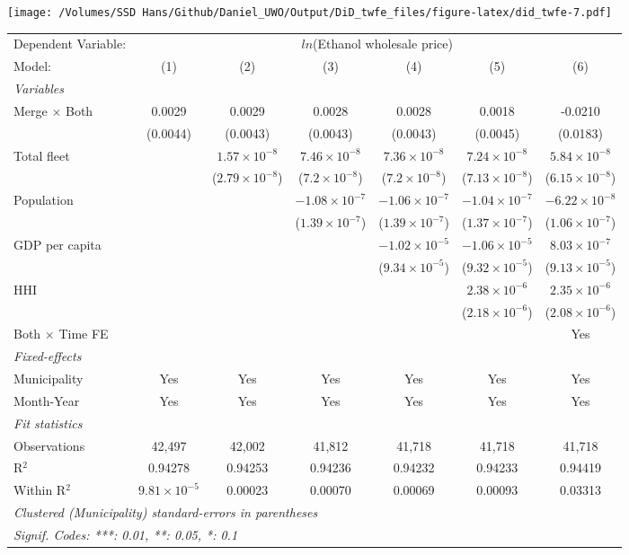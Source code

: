 \documentclass[
]{article}
\begin{document}
\texttt{[image: /Volumes/SSD Hans/Github/Daniel\_UWO/Output/DiD\_twfe\_files/figure-latex/did\_twfe-7.pdf]}

\begin{tabular}{lcccccc}
\tabularnewline\midrule\midrule
Dependent Variable:&\multicolumn{6}{c}{$ln$(Ethanol wholesale price)}\\
Model:&(1) & (2) & (3) & (4) & (5) & (6)\\
\midrule \emph{Variables}&   &   &   &   &   &  \\
Merge $\times $ Both & 0.0029 & 0.0029 & 0.0028 & 0.0028 & 0.0018 & -0.0210\\
  &(0.0044) & (0.0043) & (0.0043) & (0.0043) & (0.0045) & (0.0183)\\
Total fleet &    & $1.57\times 10^{-8}$ & $7.46\times 10^{-8}$ & $7.36\times 10^{-8}$ & $7.24\times 10^{-8}$ & $5.84\times 10^{-8}$\\
  &   & ($2.79\times 10^{-8}$) & ($7.2\times 10^{-8}$) & ($7.2\times 10^{-8}$) & ($7.13\times 10^{-8}$) & ($6.15\times 10^{-8}$)\\
Population &    &    & $-1.08\times 10^{-7}$ & $-1.06\times 10^{-7}$ & $-1.04\times 10^{-7}$ & $-6.22\times 10^{-8}$\\
  &   &    & ($1.39\times 10^{-7}$) & ($1.39\times 10^{-7}$) & ($1.37\times 10^{-7}$) & ($1.06\times 10^{-7}$)\\
GDP per capita &    &    &    & $-1.02\times 10^{-5}$ & $-1.06\times 10^{-5}$ & $8.03\times 10^{-7}$\\
  &   &    &    & ($9.34\times 10^{-5}$) & ($9.32\times 10^{-5}$) & ($9.13\times 10^{-5}$)\\
HHI &    &    &    &    & $2.38\times 10^{-6}$ & $2.35\times 10^{-6}$\\
  &   &    &    &    & ($2.18\times 10^{-6}$) & ($2.08\times 10^{-6}$)\\
Both $\times$ Time FE &  &  &  &  &  & Yes\\
\midrule \emph{Fixed-effects}&   &   &   &   &   &  \\
Municipality & Yes & Yes & Yes & Yes & Yes & Yes\\
Month-Year & Yes & Yes & Yes & Yes & Yes & Yes\\
\midrule \emph{Fit statistics}&  & & & & & \\
Observations & 42,497&42,002&41,812&41,718&41,718&41,718\\
R$^2$ & 0.94278&0.94253&0.94236&0.94232&0.94233&0.94419\\
Within R$^2$ & $9.81\times 10^{-5}$&0.00023&0.00070&0.00069&0.00093&0.03313\\
\midrule\midrule\multicolumn{7}{l}{\emph{Clustered (Municipality) standard-errors in parentheses}}\\
\multicolumn{7}{l}{\emph{Signif. Codes: ***: 0.01, **: 0.05, *: 0.1}}\\
\end{tabular}
\end{document}
